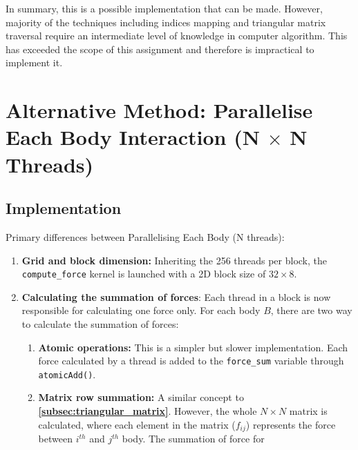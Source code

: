 \documentclass[12pt, a4paper]{article}
\let\oldcref\cref
\renewcommand{\cref}[1]{\textbf{\oldcref{#1}}}
\begin{document}
In summary, this is a possible implementation that can be made. However, majority of the techniques
including indices mapping and triangular matrix traversal require an intermediate level of knowledge
in computer algorithm. This has exceeded the scope of this assignment and therefore is impractical
to implement it.

\pagebreak
\section{Alternative Method: Parallelise Each Body Interaction (N \texorpdfstring{$\times$}{} N Threads)}
\subsection{Implementation}
Primary differences between Parallelising Each Body (N threads):
\begin{enumerate}
  \item \textbf{Grid and block dimension:} Inheriting the 256 threads per block, the
  \texttt{compute\_force} kernel is launched with a 2D block size of \(32 \times 8\).
  \item \textbf{Calculating the summation of forces}: Each thread in a block is now responsible for
  calculating one force only. For each body \(B\), there are two way to calculate the summation of
  forces:
  \begin{enumerate}
    \item \textbf{Atomic operations:} This is a simpler but slower implementation. Each force
    calculated by a thread is added to the \texttt{force\_sum} variable through
    \texttt{atomicAdd()}.
    \item \textbf{Matrix row summation:} A similar concept to \cref{subsec:triangular_matrix}.
    However, the whole \(N \times N\) matrix is calculated, where each element in the matrix
    (\(f_{ij}\)) represents the force between \(i^{th}\) and \(j^{th}\) body. The summation of force
    for
  \end{enumerate}
\end{enumerate}
\end{document}

